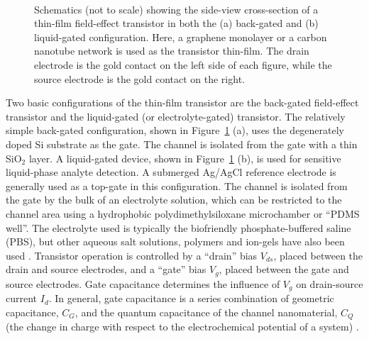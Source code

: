 \documentclass[
  a4paper,
]{scrbook}
\begin{document}
\begin{figure}
\begin{minipage}[t]{0.45\linewidth}
{{}

}

\end{minipage}%
%
\begin{minipage}[t]{0.01\linewidth}

{\centering 

~

}

\end{minipage}%

\caption[Schematics showing cross-sections of a thin-film
transistor.]{\label{fig-gating-schematics}Schematics (not to scale)
showing the side-view cross-section of a thin-film field-effect
transistor in both the (a) back-gated and (b) liquid-gated
configuration. Here, a graphene monolayer or a carbon nanotube network
is used as the transistor thin-film. The drain electrode is the gold
contact on the left side of each figure, while the source electrode is
the gold contact on the right.}

\end{figure}

Two basic configurations of the thin-film transistor are the back-gated
field-effect transistor and the liquid-gated (or electrolyte-gated)
transistor. The relatively simple back-gated configuration, shown in
Figure~\ref{fig-gating-schematics} (a), uses the degenerately doped Si
substrate as the gate. The channel is isolated from the gate with a thin
SiO\(_2\) layer. A liquid-gated device, shown in
Figure~\ref{fig-gating-schematics} (b), is used for sensitive
liquid-phase analyte detection. A submerged Ag/AgCl reference electrode
is generally used as a top-gate in this configuration. The channel is
isolated from the gate by the bulk of an electrolyte solution, which can
be restricted to the channel area using a hydrophobic
polydimethylsiloxane microchamber or ``PDMS well''. The electrolyte used
is typically the biofriendly phosphate-buffered saline (PBS), but other
aqueous salt solutions, polymers and ion-gels have also been used
\autocite{Avouris2007,Shkodra2021,Tran2016,Li2023}. Transistor operation
is controlled by a ``drain'' bias \(V_{ds}\), placed between the drain
and source electrodes, and a ``gate'' bias \(V_g\), placed between the
gate and source electrodes. Gate capacitance determines the influence of
\(V_g\) on drain-source current \(I_d\). In general, gate capacitance is
a series combination of geometric capacitance, \(C_{G}\), and the
quantum capacitance of the channel nanomaterial, \(C_{Q}\) (the change
in charge with respect to the electrochemical potential of a system)
\autocite{Avouris2007,Cao2009,Heller2009a,Tran2016,Miranda2016,Kireev2017,Li2023}.
\end{document}

